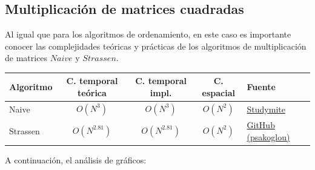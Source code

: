 \subsection{Multiplicación de matrices cuadradas}
Al igual que para los algoritmos de ordenamiento, en este caso es importante conocer las complejidades teóricas y prácticas de los algoritmos de multiplicación de matrices $Naive$ y $Strassen$.


\begin{table}[H]
\centering
\label{tab:complejidades_mat}
\begin{tabular}{|l|c|c|c|l|}
\hline
\textbf{Algoritmo} & \textbf{C. temporal teórica} & \textbf{C. temporal impl.} & \textbf{C. espacial} & \textbf{Fuente} \\ \hline
Naive & $O(N^3)$ & $O(N^3)$ & $O(N^2)$ & 
\href{https://www.studymite.com/cpp/examples/multiply-two-matrices-in-cpp}{Studymite} \\ \hline
Strassen & $O(N^{2.81})$ & $O(N^{2.81})$ & $O(N^2)$ &
\href{https://github.com/psakoglou/Strassen-Algorithm-Simulation-and-Asymptotic-Efficiency-CPP}{GitHub (psakoglou)} \\ \hline
\end{tabular}
\end{table}


A continuación, el análisis de gráficos:



